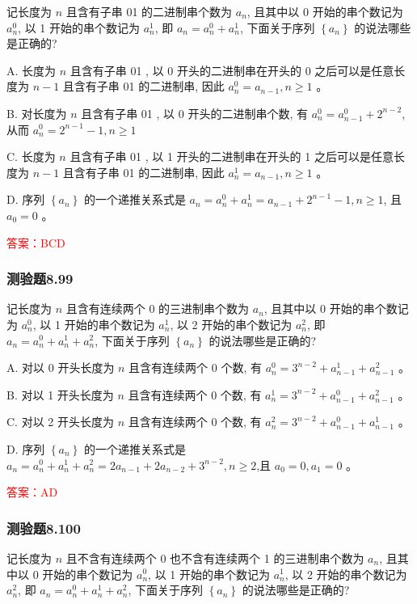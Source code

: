 \documentclass[UTF8, heading=true]{ctexart}
\begin{document}
记长度为 $n$ 且含有子串 01 的二进制串个数为 $a_n$, 且其中以 0 开始的串个数记为 $a_n^0$, 以 1 开始的串个数记为 $a_n^1$, 即 $a_n=a_n^0+a_n^1$, 下面关于序列 $\left\{a_n\right\}$ 的说法哪些是正确的?

A. 
长度为 $n$ 且含有子串 01 , 以 0 开头的二进制串在开头的 0 之后可以是任意长度为 $n-1$ 且含有子串 01 的二进制串, 因此 $a_n^0=a_{n-1}, n \geq 1$ 。

B. 
对长度为 $n$ 且含有子串 01 , 以 0 开头的二进制串个数, 有 $a_n^0=a_{n-1}^0+2^{n-2}$, 从而 $a_n^0=2^{n-1}-1, n \geq 1$

C. 
长度为 $n$ 且含有子串 01 , 以 1 开头的二进制串在开头的 1 之后可以是任意长度为 $n-1$ 且含有子串 01 的二进制串, 因此 $a_n^1=a_{n-1}, n \geq 1$ 。

D. 
序列 $\left\{a_n\right\}$ 的一个递推关系式是 $a_n=a_n^0+a_n^1=a_{n-1}+2^{n-1}-1, n \geq 1$, 且 $a_0=0$ 。

\textcolor{red}{答案：BCD}


\subsubsection{测验题8.99}

记长度为 $n$ 且含有连续两个 0 的三进制串个数为 $a_n$, 且其中以 0 开始的串个数记为 $a_n^0$, 以 1 开始的串个数记为 $a_n^1$, 以 2 开始的串个数记为 $a_n^2$, 即 $a_n=a_n^0+a_n^1+a_n^2$, 下面关于序列 $\left\{a_n\right\}$ 的说法哪些是正确的?

A. 对以 0 开头长度为 $n$ 且含有连续两个 0 个数, 有 $a_n^0=3^{n-2}+a_{n-1}^1+a_{n-1}^2$ 。

B. 对以 1 开头长度为 $n$ 且含有连续两个 0 个数, 有 $a_n^1=3^{n-2}+a_{n-1}^0+a_{n-1}^2$ 。

C. 对以 2 开头长度为 $n$ 且含有连续两个 0 个数, 有 $a_n^2=3^{n-2}+a_{n-1}^0+a_{n-1}^1$ 。

D. 序列 $\left\{a_n\right\}$ 的一个递推关系式是 $a_n=a_n^0+a_n^1+a_n^2=2 a_{n-1}+2 a_{n-2}+3^{n-2}, n \geq 2$,且 $a_0=0, a_1=0$ 。


\textcolor{red}{答案：AD}

\subsubsection{测验题8.100}

记长度为 $n$ 且不含有连续两个 0 也不含有连续两个 1 的三进制串个数为 $a_n$, 且其中以 0 开始的串个数记为 $a_n^0$, 以 1 开始的串个数记为 $a_n^1$, 以 2 开始的串个数记为 $a_n^2$, 即 $a_n=a_n^0+a_n^1+a_n^2$, 下面关于序列 $\left\{a_n\right\}$ 的说法哪些是正确的?
\end{document}
